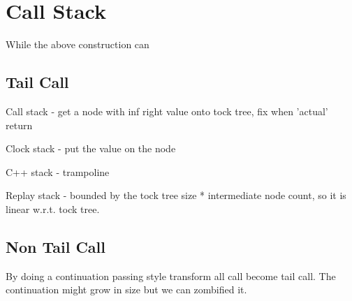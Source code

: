 \section{Call Stack}
While the above construction can 
\subsection{Tail Call}
Call stack - get a node with inf right value onto tock tree, fix when 'actual' return

Clock stack - put the value on the node

C++ stack - trampoline

Replay stack - bounded by the tock tree size * intermediate node count, so it is linear w.r.t. tock tree.
\subsection{Non Tail Call}
By doing a continuation passing style transform all call become tail call.
The continuation might grow in size but we can zombified it.